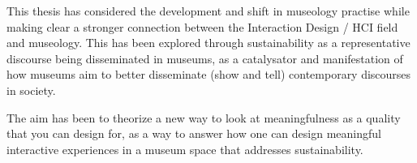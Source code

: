 This thesis has considered the development and shift in museology practise while making clear a stronger connection between the Interaction Design / HCI field and museology. This has been explored through sustainability as a representative discourse being disseminated in museums, as a catalysator and manifestation of how museums aim to better disseminate (show and tell) contemporary discourses in society. 

The aim has been to theorize a new way to look at meaningfulness as a quality that you can design for, as a way to answer how one can design meaningful interactive experiences in a museum space that addresses sustainability. 

